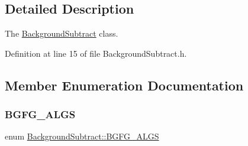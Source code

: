 \subsection{Detailed Description}
The \mbox{\hyperlink{class_background_subtract}{Background\+Subtract}} class. 

Definition at line 15 of file Background\+Subtract.\+h.



\subsection{Member Enumeration Documentation}
\mbox{\label{class_background_subtract_a56850081696df68b55f87b4f3d87949f}} 
\subsubsection{\texorpdfstring{B\+G\+F\+G\+\_\+\+A\+L\+GS}{BGFG\_ALGS}}
{\footnotesize\ttfamily enum \mbox{\hyperlink{class_background_subtract_a56850081696df68b55f87b4f3d87949f}{Background\+Subtract\+::\+B\+G\+F\+G\+\_\+\+A\+L\+GS}}}

